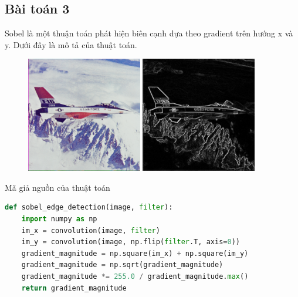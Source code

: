 \documentclass{article}
\begin{document}
\subsection{Bài toán 3}
Sobel là một thuận toán phát hiện biên cạnh dựa theo gradient trên hướng x và y. Dưới đây là mô tả của thuật toán.

\begin{figure}[H]
    \centering
    \includegraphics[width=0.45\textwidth]{airplane_raw.png}
    \includegraphics[width=0.45\textwidth]{airplane.png}
\end{figure}

Mã giả nguồn của thuật toán 
\begin{onehalfspace}
\begin{lstlisting}[language=Python]
def sobel_edge_detection(image, filter):
    import numpy as np
    im_x = convolution(image, filter)
    im_y = convolution(image, np.flip(filter.T, axis=0))
    gradient_magnitude = np.square(im_x) + np.square(im_y)
    gradient_magnitude = np.sqrt(gradient_magnitude)
    gradient_magnitude *= 255.0 / gradient_magnitude.max()
    return gradient_magnitude
\end{lstlisting}
\end{onehalfspace}

\end{document}
